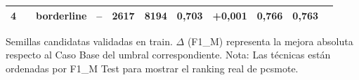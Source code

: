 \documentclass{article}
\begin{document}
\begin{table}[ht]
\begin{minipage}{\textwidth}
\begin{tabular}{cclccccccrc}
            4 & & borderline & -- & 2617 & 8194 & 0,703 & +0,001 & 0,766 & 0,763 \\
            \bottomrule
        \end{tabular}
        \vspace{1mm}
        \begin{flushleft}
            \footnotesize * Semillas candidatas validadas en train. $\Delta$ (F1\_M) representa la mejora absoluta respecto al Caso Base del umbral correspondiente. Nota: Las técnicas están ordenadas por F1\_M Test para mostrar el ranking real de pcsmote.
        \end{flushleft}
    \end{minipage}
\end{table}
\end{document}
